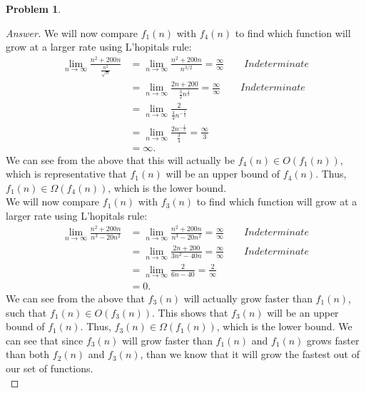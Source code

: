 \documentclass[11pt]{article}
\theoremstyle{definition}
\theoremstyle{definition}
\newtheorem{required}{Problem}
\theoremstyle{definition}
\begin{document}
\begin{required}
\begin{enumerate} [label=(\alph*)]
\begin{proof}[Answer]
We will now compare $f_1(n)$ with $f_4(n)$ to find which function will grow at a larger rate using L'hopitals rule: \\
\begin{align*}
\lim_{n \to \infty} \frac{n^2+200n}{\frac{n^2}{\sqrt{n}}} &= \lim_{n \to \infty} \frac{n^2+200n}{n^{3/2}}  = \frac{\infty}{\infty} \qquad Indeterminate  \\
&= \lim_{n \to \infty} \frac{2n+200}{\frac{3}{2}n^{\frac{1}{2}}}  = \frac{\infty}{\infty} \qquad Indeterminate \\
&= \lim_{n \to \infty} \frac{2}{\frac{3}{4}n^{-\frac{1}{2}}}  \\
&= \lim_{n \to \infty} \frac{2n^{-\frac{1}{2}}}{\frac{3}{4}}  = \frac{\infty}{3}  \\
&= \infty.
\end{align*} 
We can see from the above that this will actually be $f_4(n) \in O(f_1(n))$, which is representative that $f_1(n)$ will be an upper bound of $f_4(n)$. Thus, $f_1(n) \in \Omega(f_4(n))$, which is the lower bound. \\

We will now compare $f_1(n)$ with $f_3(n)$ to find which function will grow at a larger rate using L'hopitals rule: \\
\begin{align*}
\lim_{n \to \infty} \frac{n^2+200n}{n^{3}-20n^{2}} &= \lim_{n \to \infty} \frac{n^2+200n}{n^{3}-20n^{2}}  = \frac{\infty}{\infty} \qquad Indeterminate  \\
&= \lim_{n \to \infty} \frac{2n+200}{3n^{2}-40n}  = \frac{\infty}{\infty} \qquad Indeterminate \\
&= \lim_{n \to \infty} \frac{2}{6n-40}  = \frac{2}{\infty}  \\
&= 0.
\end{align*} 
We can see from the above that $f_3(n)$ will actually grow faster than $f_1(n)$, such that $f_1(n) \in O(f_3(n))$. This shows that $f_3(n)$ will be an upper bound of $f_1(n)$. Thus, $f_3(n) \in \Omega(f_1(n))$, which is the lower bound. We can see that since $f_3(n)$ will grow faster than $f_1(n)$ and $f_1(n)$ grows faster than both $f_2(n)$ and $f_3(n)$, than we know that it will grow the fastest out of our set of functions. \\


\end{proof}
\end{enumerate}
\end{required}
\end{document}
